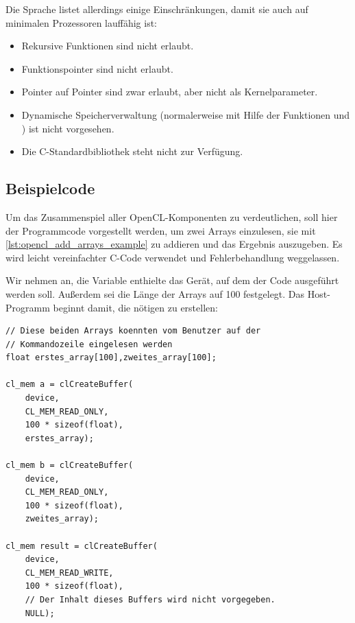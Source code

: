Die Sprache listet allerdings einige Einschränkungen, damit sie auch
auf minimalen Prozessoren lauffähig ist:

\begin{itemize}
\item Rekursive Funktionen sind nicht erlaubt.
\item Funktionspointer sind nicht erlaubt.
\item Pointer auf Pointer sind zwar erlaubt, aber nicht als Kernelparameter.
\item Dynamische Speicherverwaltung (normalerweise mit Hilfe der Funktionen  und ) ist nicht vorgesehen.
\item Die C-Standardbibliothek steht nicht zur Verfügung.
\end{itemize}

\subsection{Beispielcode}

Um das Zusammenspiel aller OpenCL-Komponenten zu verdeutlichen, soll
hier der Programmcode vorgestellt werden, um zwei Arrays einzulesen,
sie mit \cref{lst:opencl_add_arrays_example} zu addieren
und das Ergebnis auszugeben. Es wird leicht vereinfachter C-Code
verwendet und \PimiddyzB{} Fehlerbehandlung weggelassen.

Wir nehmen an, die Variable  enthielte das
Gerät, auf dem der Code ausgeführt werden soll. Außerdem sei die Länge
der Arrays auf 100 festgelegt. Das Host-Programm beginnt damit, die
nötigen  zu erstellen:

\begin{verbatim}
// Diese beiden Arrays koennten vom Benutzer auf der
// Kommandozeile eingelesen werden
float erstes_array[100],zweites_array[100];

cl_mem a = clCreateBuffer(
    device,
    CL_MEM_READ_ONLY,
    100 * sizeof(float),
    erstes_array);

cl_mem b = clCreateBuffer(
    device,
    CL_MEM_READ_ONLY,
    100 * sizeof(float),
    zweites_array);

cl_mem result = clCreateBuffer(
    device,
    CL_MEM_READ_WRITE,
    100 * sizeof(float),
    // Der Inhalt dieses Buffers wird nicht vorgegeben.
    NULL);
\end{verbatim}

